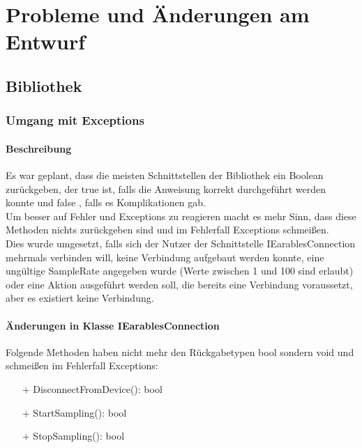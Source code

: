\documentclass[a4paper,12pt]{article}
\begin{document}
\section{Probleme und Änderungen am Entwurf}
\subsection{Bibliothek}

\subsubsection{Umgang mit Exceptions}
\paragraph{Beschreibung}
Es war geplant, dass die meisten Schnittstellen der Bibliothek ein Boolean zurückgeben, der true ist, falls die Anweisung korrekt durchgeführt werden konnte und false , falls es Komplikationen gab.\\
Um besser auf Fehler und Exceptions zu reagieren macht es mehr Sinn, dass diese Methoden nichts zurückgeben sind und im Fehlerfall Exceptions schmeißen.\\
Dies wurde umgesetzt, falls sich der Nutzer der Schnittstelle IEarablesConnection mehrmals verbinden will, keine Verbindung aufgebaut werden konnte, eine ungültige SampleRate angegeben wurde (Werte zwischen 1 und 100 sind erlaubt) oder eine Aktion ausgeführt werden soll, die bereits eine Verbindung voraussetzt, aber es existiert keine Verbindung.

\paragraph{Änderungen in Klasse IEarablesConnection}
Folgende Methoden haben nicht mehr den Rückgabetypen bool sondern void und schmeißen im Fehlerfall Exceptions:
\begin{itemize}
	\item[+] DisconnectFromDevice(): bool
	\item[+] StartSampling(): bool
	\item[+] StopSampling(): bool
\end{itemize} 
\end{document}
